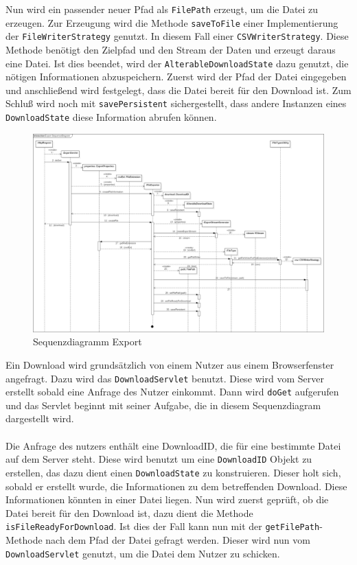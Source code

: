 Nun wird ein passender neuer Pfad als \texttt{FilePath} erzeugt, um die Datei zu erzeugen. Zur Erzeugung wird die Methode \texttt{saveToFile} einer Implementierung der \texttt{FileWriterStrategy} genutzt. In diesem Fall einer \texttt{CSVWriterStrategy}. Diese Methode benötigt den Zielpfad und den Stream der Daten und erzeugt daraus eine Datei. Ist dies beendet, wird der \texttt{AlterableDownloadState} dazu genutzt, die nötigen Informationen abzuspeichern. Zuerst wird der Pfad der Datei eingegeben und anschließend wird festgelegt, dass die Datei bereit für den Download ist. Zum Schluß wird noch mit \texttt{savePersistent} sichergestellt, dass andere Instanzen eines \texttt{DownloadState} diese Information abrufen können.
\begin{figure}[!hbp]
	\centering
	\includegraphics[width=1.25\linewidth,angle=90]{images/export/ExportSequenceDiagram.png}
	\caption{Sequenzdiagramm Export}
\end{figure}
\newpage
Ein Download wird grundsätzlich von einem Nutzer aus einem Browserfenster angefragt. Dazu wird das \texttt{DownloadServlet} benutzt. Diese wird vom Server erstellt sobald eine Anfrage des Nutzer einkommt. Dann wird \texttt{doGet} aufgerufen und das Servlet beginnt mit seiner Aufgabe, die in diesem Sequenzdiagram dargestellt wird.\\\\
Die Anfrage des nutzers enthält eine DownloadID, die für eine bestimmte Datei auf dem Server steht. Diese wird benutzt um eine \texttt{DownloadID} Objekt zu erstellen, das dazu dient einen \texttt{DownloadState} zu konstruieren. Dieser holt sich, sobald er erstellt wurde, die Informationen zu dem betreffenden Download. Diese Informationen könnten in einer Datei liegen. Nun wird zuerst geprüft, ob die Datei bereit für den Download ist, dazu dient die Methode \texttt{isFileReadyForDownload}. Ist dies der Fall kann nun mit der \texttt{getFilePath}-Methode nach dem Pfad der Datei gefragt werden. Dieser wird nun vom \texttt{DownloadServlet} genutzt, um die Datei dem Nutzer zu schicken.\\\\
